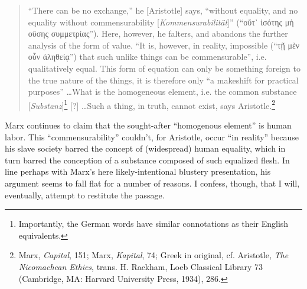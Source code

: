 \documentclass[12pt]{article}
\begin{document}
\begin{quote}
\begin{singlespace}
``There can be no exchange,'' he [Aristotle] says, ``without equality, and no equality without commensurability [\textit{Kommensurabilität}]'' (``οὔτ᾿ ἰσότης μὴ οὔσης συμμετρίας''). Here, however, he falters, and abandons the further analysis of the form of value. ``It is, however, in reality, impossible (``τῇ μὲν οὖν ἀληθείᾳ'') that such unlike things can be commensurable'', i.e. qualitatively equal. This form of equation can only be something foreign to the true nature of the things, it is therefore only ``a makeshift for practical purposes'' \dots  What is the homogeneous element, i.e. the common substance [\textit{Substanz}]\footnote{Importantly, the German words have similar connotations as their English equivalents.} [?] \dots  Such a thing, in truth, cannot exist, says Aristotle.\footnote{Marx, \textit{Capital}, 151; Marx, \textit{Kapital}, 74; Greek in original, cf. Aristotle, \textit{The Nicomachean Ethics}, trans. H. Rackham, Loeb Classical Library 73 (Cambridge, MA: Harvard University Press, 1934), 286.}
\end{singlespace}
\end{quote}

Marx continues to claim that the sought-after ``homogenous element'' is human labor. This ``commensurability'' couldn't, for Aristotle, occur ``in reality'' because his slave society barred the concept of (widespread) human equality, which in turn barred the conception of a substance composed of such equalized flesh. In line perhaps with Marx's here likely-intentional blustery presentation, his argument seems to fall flat for a number of reasons. I confess, though, that I will, eventually, attempt to restitute the passage.   
\end{document}
